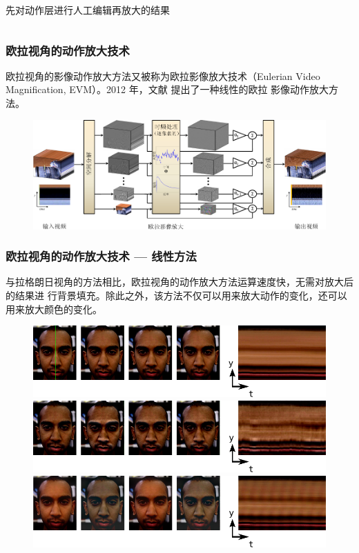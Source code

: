\documentclass[xcolor=svgnames,serif,table]{beamer}
\begin{document}
\begin{frame}
\begin{columns}
    先对动作层进行人工编辑再放大的结果
  \end{columns}
  
\end{frame}

\begin{frame}
  \frametitle{欧拉视角的动作放大技术}
  欧拉视角的影像动作放大方法又被称为欧拉影像放大技术（Eulerian Video
  Magnification, EVM）。2012 年，文献 \cite{wu2012eulerian} 提出了一种线性的欧拉
  影像动作放大方法。
\begin{figure}[htbp]
  \centering
  \includegraphics[width=.9\textwidth]{linear.pdf}
  \label{fig:linear}
\end{figure}
\end{frame}

\begin{frame}
  \frametitle{欧拉视角的动作放大技术 --- 线性方法}
  \small
  与拉格朗日视角的方法相比，欧拉视角的动作放大方法运算速度快，无需对放大后的结果进
行背景填充。除此之外，该方法不仅可以用来放大动作的变化，还可以用来放大颜色的变化。
  \begin{figure}[htbp]
  \centering
    \includegraphics[width=.65\textwidth]{motion-color-1.pdf}\\
    \includegraphics[width=.65\textwidth]{motion-color-2.pdf}\\
    \includegraphics[width=.65\textwidth]{motion-color-3.pdf}\\
  \end{figure}
\end{frame}
\end{document}
